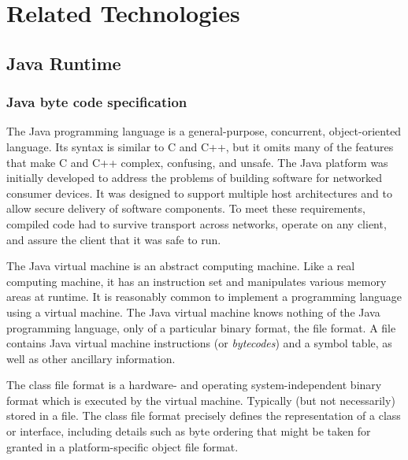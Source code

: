 \chapter{Related Technologies}

\section{Java Runtime}

\subsection{Java byte code specification}
The Java \cite{JavaSpec} programming language is a general-purpose, concurrent,
object-oriented language. Its syntax is similar to C and C++, but it omits many
of the features that make C and C++ complex, confusing, and unsafe. The Java
platform was initially developed to address the problems of building software
for networked consumer devices. It was designed to support multiple host
architectures and to allow secure delivery of software components. To meet these
requirements, compiled code had to survive transport across networks, operate on
any client, and assure the client that it was safe to run.

The Java virtual machine is an abstract computing machine. Like a real computing
machine, it has an instruction set and manipulates various memory areas at
runtime. It is reasonably common to implement a programming language using a
virtual machine. The Java virtual machine knows nothing of the Java programming
language, only of a particular binary format, the   file format. A
 file contains Java virtual machine instructions (or 
\emph{bytecodes}) and a symbol table, as well as other ancillary information.

The class file format is a hardware- and operating system-independent binary
format which is executed by the virtual machine. Typically (but not necessarily)
stored in a file. The class file format precisely defines the representation of a
class or interface, including details such as byte ordering that might be taken
for granted in a platform-specific object file format.

